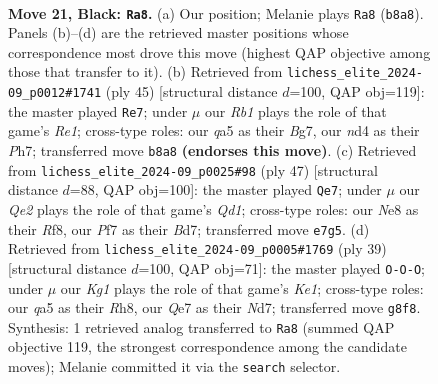 \documentclass[11pt]{article}
\begin{document}
\clearpage

\begin{figure}[p]\centering
\begin{subfigure}{0.46\textwidth}\centering
\resizebox{\linewidth}{!}{%
\newchessgame
\chessboard[
  setfen={1rbrn1k1/p1p1qp2/6p1/Q1PpP2p/3N4/1P2P1P1/p2B1P1P/2K1RBR1 b - - 0 21},
  showmover=false,
  pgfstyle=straightmove, color=movearrow, markmove={b8-a8}
]}
\caption{}
\end{subfigure}\hfill
\begin{subfigure}{0.46\textwidth}\centering
\resizebox{\linewidth}{!}{%
\newchessgame
\chessboard[
  setfen={2r1r1k1/2qn1pbp/pp1pp1p1/8/P1PP1Q2/1P1B1R1P/1B3PP1/3R2K1 b - - 2 23},
  showmover=false,
  pgfstyle=straightmove, color=movearrow, markmove={e8-e7}
]}
\caption{}
\end{subfigure}
\\[4pt]
\begin{subfigure}{0.46\textwidth}\centering
\resizebox{\linewidth}{!}{%
\newchessgame
\chessboard[
  setfen={r2q1r1k/1p1b1ppn/3p3p/3Pp2n/1Q2P2P/1N1B1PP1/P4B2/R3K2R b KQ - 3 24},
  showmover=false,
  pgfstyle=straightmove, color=movearrow, markmove={d8-e7}
]}
\caption{}
\end{subfigure}\hfill
\begin{subfigure}{0.46\textwidth}\centering
\resizebox{\linewidth}{!}{%
\newchessgame
\chessboard[
  setfen={r3k2r/ppqnbpp1/2p1p1p1/4P3/2PP3P/3BB1P1/PP2Q3/1K1R3R b kq - 0 20},
  showmover=false,
  pgfstyle=straightmove, color=movearrow, markmove={e8-c8}
]}
\caption{}
\end{subfigure}
\caption{\textbf{Move 21, Black: \texttt{Ra8}.} (a) Our position; Melanie plays \texttt{Ra8} (\texttt{b8a8}). Panels (b)--(d) are the retrieved master positions whose correspondence most drove this move (highest QAP objective among those that transfer to it). (b) Retrieved from \texttt{lichess\_elite\_2024-09\_p0012\#1741} (ply 45) [structural distance $d$=100, QAP obj=119]: the master played \texttt{Re7}; under $\mu$ our \emph{Rb1} plays the role of that game's \emph{Re1}; cross-type roles: our \emph{q}a5 as their \emph{B}g7, our \emph{n}d4 as their \emph{P}h7; transferred move \texttt{b8a8} \textbf{(endorses this move)}. (c) Retrieved from \texttt{lichess\_elite\_2024-09\_p0025\#98} (ply 47) [structural distance $d$=88, QAP obj=100]: the master played \texttt{Qe7}; under $\mu$ our \emph{Qe2} plays the role of that game's \emph{Qd1}; cross-type roles: our \emph{N}e8 as their \emph{R}f8, our \emph{P}f7 as their \emph{B}d7; transferred move \texttt{e7g5}. (d) Retrieved from \texttt{lichess\_elite\_2024-09\_p0005\#1769} (ply 39) [structural distance $d$=100, QAP obj=71]: the master played \texttt{O-O-O}; under $\mu$ our \emph{Kg1} plays the role of that game's \emph{Ke1}; cross-type roles: our \emph{q}a5 as their \emph{R}h8, our \emph{Q}e7 as their \emph{N}d7; transferred move \texttt{g8f8}. Synthesis: 1 retrieved analog transferred to \texttt{Ra8} (summed QAP objective 119, the strongest correspondence among the candidate moves); Melanie committed it via the \texttt{search} selector.}
\label{fig:thought-m41}
\end{figure}
\end{document}
